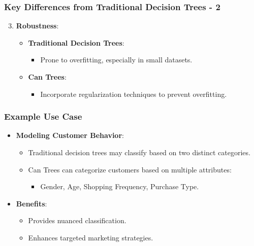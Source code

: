 \documentclass[aspectratio=169]{beamer}
\begin{document}
\begin{frame}[fragile]
    \frametitle{Key Differences from Traditional Decision Trees - 2}
    \begin{enumerate}
        \setcounter{enumi}{2}
        \item \textbf{Robustness}:
            \begin{itemize}
                \item \textbf{Traditional Decision Trees}:
                    \begin{itemize}
                        \item Prone to overfitting, especially in small datasets.
                    \end{itemize}
                \item \textbf{Can Trees}:
                    \begin{itemize}
                        \item Incorporate regularization techniques to prevent overfitting.
                    \end{itemize}
            \end{itemize}
    \end{enumerate}
\end{frame}

\begin{frame}[fragile]
    \frametitle{Example Use Case}
    \begin{itemize}
        \item \textbf{Modeling Customer Behavior}:
        \begin{itemize}
            \item Traditional decision trees may classify based on two distinct categories.
            \item Can Trees can categorize customers based on multiple attributes:
                \begin{itemize}
                    \item Gender, Age, Shopping Frequency, Purchase Type.
                \end{itemize}
        \end{itemize}
        \item \textbf{Benefits}:
        \begin{itemize}
            \item Provides nuanced classification.
            \item Enhances targeted marketing strategies.
        \end{itemize}
    \end{itemize}
\end{frame}
\end{document}
